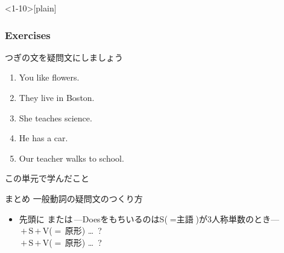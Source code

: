 \documentclass[aspectratio=169,xcolor={dvipsnames,table}]{beamer}
\newcommand{\myaudio}[1]{\href{#1}{\faVolumeUp}}
\begin{document}
\begin{frame}<1-10>[plain]\frametitle{Exercises}

つぎの文を疑問文にしましょう

 \begin{enumerate}
  \item<1-> You like flowers.\hspace{59.7pt}
  \item<1-> They live in Boston.\hspace{47.5pt}%
  \item<1-> She teaches science.\hspace{42pt}%
  \item<1-> He has  a car.\hspace{80.5pt}%
  \item<1-> Our teacher walks to school.
 \end{enumerate}



\mbox{}\hfill\myaudio{./audio/008_question_do_06.mp3}


\end{frame}
\begin{frame}[plain]{この単元で学んだこと}
 \begin{exampleblock}{まとめ}
一般動詞の疑問文のつくり方
\begin{itemize}\small
 \item<3->   先頭に\,\,または\,\hspace{15pt}---DoesをもちいるのはS{\scriptsize ($=\text{主語}$)}が3人称単数のとき---\\
	 \mbox{}\hspace{15pt}\,$+$\,S\,$+$\,V{\scriptsize ($=$\,原形)} \ldots\,\,\,?\\
	 \mbox{}\hspace{15pt}\,$+$\,S\,$+$\,V{\scriptsize ($=$\,原形)} \ldots\,\,\,?
\end{itemize}
\end{exampleblock}
\end{frame}
\end{document}
